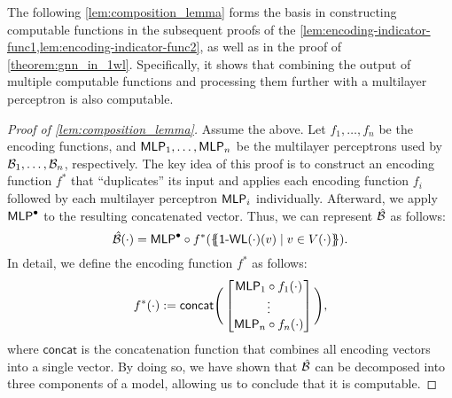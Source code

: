 The following \cref{lem:composition_lemma} forms the basis in constructing \wlnn computable functions in the subsequent proofs of the \cref{lem:encoding-indicator-func1,lem:encoding-indicator-func2}, as well as in the proof of \cref{theorem:gnn_in_1wl}. Specifically, it shows that combining the output of multiple \wlnn computable functions and processing them further with a multilayer perceptron is also \wlnn computable.
\begin{proof}[Proof of \cref{lem:composition_lemma}]
    \sloppy Assume the above. Let $f_{1}, \ldots, f_{n}$ be the encoding functions, and $\textsf{MLP}_1, \ldots, \textsf{MLP}_n$ be the multilayer perceptrons used by $\mathcal{B}_1, \dots, \mathcal{B}_n$, respectively. The key idea of this proof is to construct an encoding function $f^*$ that ``duplicates'' its input and applies each encoding function $f_i$ followed by each multilayer perceptron $\textsf{MLP}_i$ individually. Afterward, we apply $\textsf{MLP}^\bullet$ to the resulting concatenated vector. Thus, we can represent $\hat{\mathcal{B}}$ as follows:
    \begin{equation*}
        \hat{\mathcal{B}}(\cdot) = \textsf{MLP}^\bullet \circ f^* (\{\!\!\{ \textsf{1-WL}(\cdot)(v) \mid v \in V(\cdot) \}\!\!\}).
    \end{equation*}
    In detail, we define the encoding function $f^*$ as follows:
    \begin{equation*}
        f^*(\cdot) := \textsf{concat}\Bigg(
            \begin{bmatrix}
                \textsf{MLP}_1 \circ f_1(\cdot)\\
                \vdots\\
                \textsf{MLP}_n \circ f_n(\cdot)
            \end{bmatrix}\Bigg),
    \end{equation*}
    where $\textsf{concat}$ is the concatenation function that combines all encoding vectors into a single vector. By doing so, we have shown that $\hat{\mathcal{B}}$ can be decomposed into three components of a \wlnn model, allowing us to conclude that it is \wlnn computable.
\end{proof}

